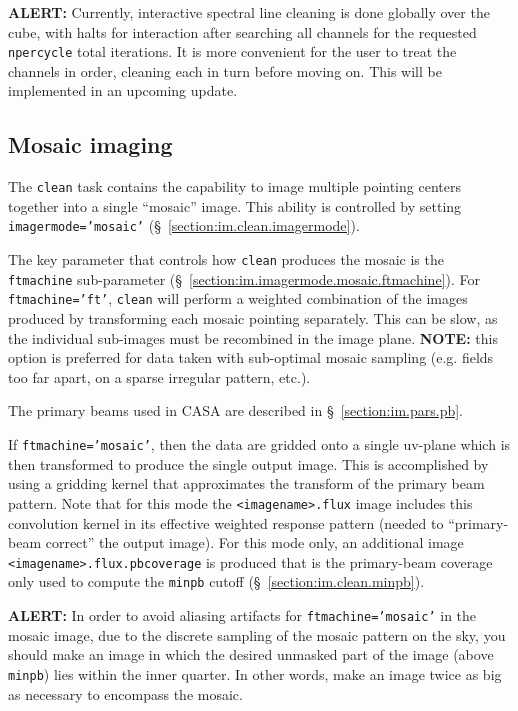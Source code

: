 {\bf ALERT:} Currently, interactive spectral line cleaning
is done globally over the cube, with halts for interaction after
searching all channels for the requested {\tt npercycle} total
iterations.  It is more convenient for the user to treat the
channels in order, cleaning each in turn before moving on.  This
will be implemented in an upcoming update.

\subsection{Mosaic imaging}
\label{section:im.clean.mosaic}

The {\tt clean} task contains the capability to image multiple
pointing centers together into a single ``mosaic'' image.  This
ability is controlled by setting {\tt imagermode='mosaic'}
(\S~\ref{section:im.clean.imagermode}).

The key parameter that controls how {\tt clean} produces the mosaic
is the {\tt ftmachine} sub-parameter 
(\S~\ref{section:im.imagermode.mosaic.ftmachine}).  For 
{\tt ftmachine='ft'}, {\tt clean} will perform a weighted combination
of the images produced by transforming each mosaic pointing
separately.  This can be slow, as the individual sub-images must be
recombined in the image plane.  {\bf NOTE:} this option is preferred
for data taken with sub-optimal mosaic sampling (e.g. fields too 
far apart, on a sparse irregular pattern, etc.).

The primary beams used in CASA are described in \S~\ref{section:im.pars.pb}.

If {\tt ftmachine='mosaic'}, then the data are gridded onto a single
uv-plane which is then transformed to produce the single output 
image.  This is accomplished by using a gridding kernel that 
approximates the transform of the primary beam pattern.  Note that
for this mode the {\tt <imagename>.flux} image includes this
convolution kernel in its effective weighted response pattern (needed
to ``primary-beam correct'' the output image).  For this mode only,
an additional image {\tt <imagename>.flux.pbcoverage} is produced that
is the primary-beam coverage only used to compute the {\tt minpb}
cutoff (\S~\ref{section:im.clean.minpb}).

{\bf ALERT:} In order to avoid aliasing artifacts for
{\tt ftmachine='mosaic'} in the mosaic image, due to the discrete
sampling of the mosaic pattern on the sky, you should make an image
in which the desired unmasked part of the image (above {\tt minpb}) 
lies within the inner quarter.  In other words, make an image twice
as big as necessary to encompass the mosaic.

